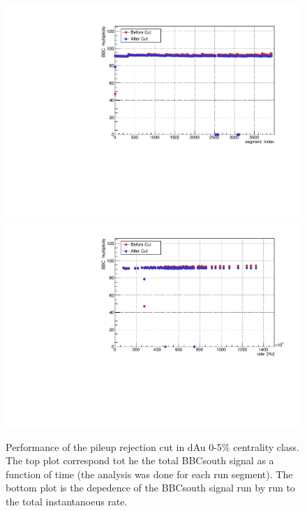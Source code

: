 \documentclass{article}
\begin{document}
\begin{figure}
\includegraphics[width=\textwidth]{fig_pileup/dAu200MB_TimingBBC_BBCM}\\
\includegraphics[width=\textwidth]{fig_pileup/dAu200MB_TimingBBC_RATEBBCM}
\label{fig.dau200mb.bbcrate}
\caption{Performance of the pileup rejection cut in dAu 0-5\% centrality class. The top plot correspond tot he the total BBCsouth signal as a function of time (the analysis was done for each run segment). The bottom plot is the depedence of the BBCsouth signal run by run to the total instantanoeus rate.}
\end{figure}


%
\end{document}
